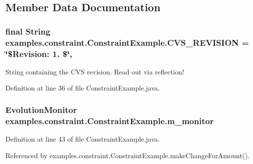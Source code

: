 \subsection{Member Data Documentation}
\hypertarget{classexamples_1_1constraint_1_1_constraint_example_ac19bc67be381cb06e02a06f01b92289e}{
\subsubsection[{C\-V\-S\-\_\-\-R\-E\-V\-I\-S\-I\-O\-N}]{\setlength{\rightskip}{0pt plus 5cm}final String examples.\-constraint.\-Constraint\-Example.\-C\-V\-S\-\_\-\-R\-E\-V\-I\-S\-I\-O\-N = \char`\"{}\$Revision\-: 1. \$\char`\"{}\hspace{0.3cm}{\ttfamily [static]}, {\ttfamily [private]}}}\label{classexamples_1_1constraint_1_1_constraint_example_ac19bc67be381cb06e02a06f01b92289e}
String containing the C\-V\-S revision. Read out via reflection! 

Definition at line 36 of file Constraint\-Example.\-java.

\hypertarget{classexamples_1_1constraint_1_1_constraint_example_a9545f75c956d587efbf4fa0d7a2dd71c}{
\subsubsection[{m\-\_\-monitor}]{\setlength{\rightskip}{0pt plus 5cm}Evolution\-Monitor examples.\-constraint.\-Constraint\-Example.\-m\-\_\-monitor\hspace{0.3cm}{\ttfamily [static]}}}\label{classexamples_1_1constraint_1_1_constraint_example_a9545f75c956d587efbf4fa0d7a2dd71c}


Definition at line 43 of file Constraint\-Example.\-java.



Referenced by examples.\-constraint.\-Constraint\-Example.\-make\-Change\-For\-Amount().

